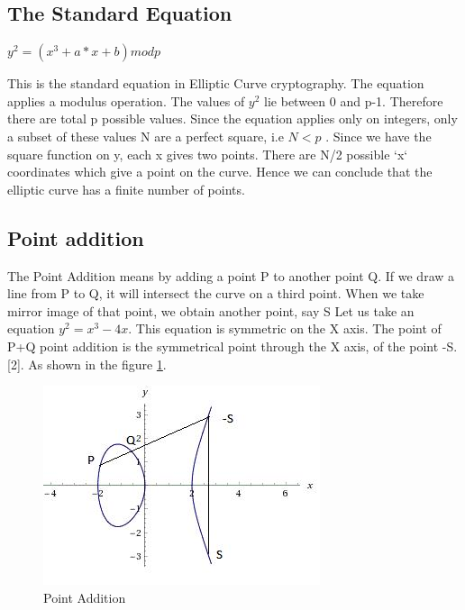 \documentclass{report}
\begin{document}
\subsection{The Standard Equation}
\begin{center}
         $y^2 = (x^3 + a * x + b) mod p$
         \end{center}
This is the standard equation in Elliptic Curve cryptography.
The equation applies a modulus operation. The values of $y^2$ lie between 0 and p-1. Therefore there are total p possible values. Since the equation applies only on integers, only a subset of these values N are a perfect square, i.e $N < p$ .
Since we have the square function on y, each x gives two points. There are N/2 possible ‘x‘ coordinates which give a point on the curve. Hence we can conclude that the elliptic curve has a finite number of points. 

\subsection{Point addition}
The Point Addition means by adding a point P to another point Q. If we draw a line from P to Q, it will intersect the curve on a third point. When we take mirror image of that point, we obtain another point, say S
Let us take an equation $y^2 = x^3 - 4x$. This equation is symmetric on the X axis. The point of P+Q point addition is the symmetrical point through the X axis, of the point -S.[2]. As shown in the figure \ref{fig:ptadd}.\cite{WinNT21}
\begin{figure}
 \centering
\includegraphics[scale=0.75]{elliptic2.jpg}
    \caption{Point Addition}
    \label{fig:ptadd}
\end{figure}
\end{document}
